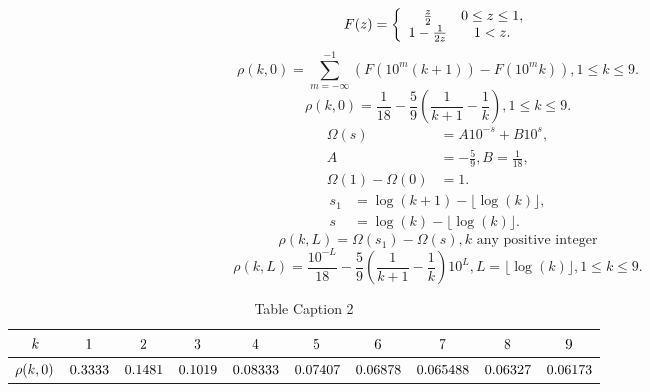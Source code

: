 \documentclass[titlepage,fleqn]{article}%
\begin{document}
\[
F(z)=\left\{
\begin{array}
[c]{cc}%
\frac{z}{2} & 0\leq z\leq1,\\
1-\frac{1}{2z} & 1<z.
\end{array}
\right.
\]%
\[
\rho(k,0)=%
{\displaystyle\sum\limits_{m=-\infty}^{-1}}
\left(  F(10^{m}(k+1))-F(10^{m}k)\right)  ,1\leq k\leq9.
\]%
\begin{equation}
\rho(k,0)=\frac{1}{18}-\frac{5}{9}\left(  \frac{1}{k+1}-\frac{1}{k}\right)
,1\leq k\leq9.\label{Rati01}%
\end{equation}%
\begin{align*}
\Omega(s) &  =A10^{-s}+B10^{s},\\
A &  =-\frac{5}{9},B=\frac{1}{18},\\
\Omega(1)-\Omega(0) &  =1.
\end{align*}%
\begin{align*}
s_{1} &  =\log(k+1)-\lfloor\log(k)\rfloor,\\
s &  =\log(k)-\lfloor\log(k)\rfloor.
\end{align*}%
\[
\rho(k,L)=\Omega(s_{1})-\Omega(s),k\text{ \ any positive integer}%
\]%
\begin{equation}
\rho(k,L)=\frac{10^{-L}}{18}-\frac{5}{9}\left(  \frac{1}{k+1}-\frac{1}%
{k}\right)  10^{L},L=\lfloor\log(k)\rfloor,1\leq k\leq9.\label{Ratio2}%
\end{equation}%
\begin{table}[!htbp] \centering
\begin{tabular}
[c]{|c|c|c|c|c|c|c|c|c|c|}\hline\hline
${\small k}$ & ${\small 1}$ & ${\small 2}$ & ${\small 3}$ & ${\small 4}$ &
${\small 5}$ & ${\small 6}$ & ${\small 7}$ & ${\small 8}$ & ${\small 9}%
$\\\hline
${\small \rho(k,0)}$ & ${\small 0.3333}$ & ${\small 0.1481}$ &
${\small 0.1019}$ & ${\small 0.08333}$ & ${\small 0.07407}$ &
${\small 0.06878}$ & ${\small 0.065488}$ & ${\small 0.06327}$ &
${\small 0.06173}$\\\hline\hline
\end{tabular}
\caption{Table Caption 2}\label{TableKey2}%
\end{table}%


\bigskip
\end{document}
